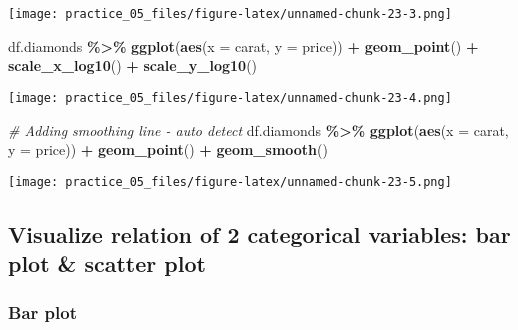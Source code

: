 \documentclass[
]{article}
\newenvironment{Shaded}{\begin{snugshade}}{\end{snugshade}}
\newcommand{\AttributeTok}[1]{\textcolor[rgb]{0.13,0.29,0.53}{#1}}
\newcommand{\CommentTok}[1]{\textcolor[rgb]{0.56,0.35,0.01}{\textit{#1}}}
\newcommand{\FunctionTok}[1]{\textcolor[rgb]{0.13,0.29,0.53}{\textbf{#1}}}
\newcommand{\NormalTok}[1]{#1}
\newcommand{\SpecialCharTok}[1]{\textcolor[rgb]{0.81,0.36,0.00}{\textbf{#1}}}
\begin{document}
\texttt{[image: practice\_05\_files/figure-latex/unnamed-chunk-23-3.png]}

\begin{Shaded}
\begin{Highlighting}[]
\NormalTok{df.diamonds }\SpecialCharTok{\%\textgreater{}\%} 
  \FunctionTok{ggplot}\NormalTok{(}\FunctionTok{aes}\NormalTok{(}\AttributeTok{x =}\NormalTok{ carat,}
             \AttributeTok{y =}\NormalTok{ price)) }\SpecialCharTok{+}
  \FunctionTok{geom\_point}\NormalTok{() }\SpecialCharTok{+}
  \FunctionTok{scale\_x\_log10}\NormalTok{() }\SpecialCharTok{+}
  \FunctionTok{scale\_y\_log10}\NormalTok{() }
\end{Highlighting}
\end{Shaded}

\texttt{[image: practice\_05\_files/figure-latex/unnamed-chunk-23-4.png]}

\begin{Shaded}
\begin{Highlighting}[]
\CommentTok{\# Adding smoothing line {-} auto detect }
\NormalTok{df.diamonds }\SpecialCharTok{\%\textgreater{}\%} 
  \FunctionTok{ggplot}\NormalTok{(}\FunctionTok{aes}\NormalTok{(}\AttributeTok{x =}\NormalTok{ carat,}
             \AttributeTok{y =}\NormalTok{ price)) }\SpecialCharTok{+}
  \FunctionTok{geom\_point}\NormalTok{() }\SpecialCharTok{+}
  \FunctionTok{geom\_smooth}\NormalTok{()}
\end{Highlighting}
\end{Shaded}

\texttt{[image: practice\_05\_files/figure-latex/unnamed-chunk-23-5.png]}

\subsection{Visualize relation of 2 categorical variables: bar plot \&
scatter
plot}\label{visualize-relation-of-2-categorical-variables-bar-plot-scatter-plot}

\subsubsection{Bar plot}\label{bar-plot-1}
\end{document}

